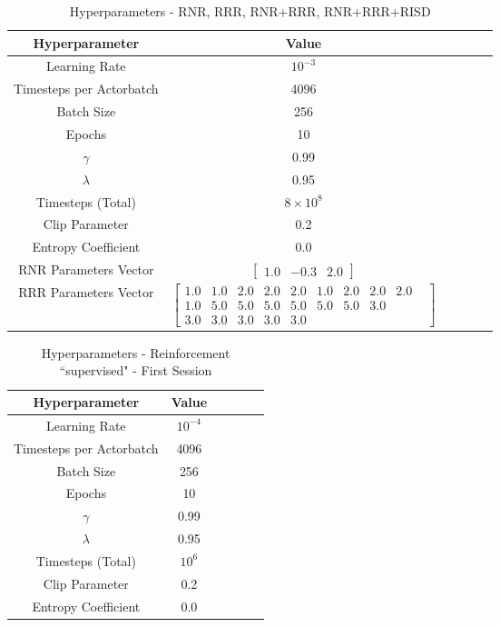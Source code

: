 
\begin{table}[!htbp]
	\caption{Hyperparameters - RNR, RRR, RNR+RRR, RNR+RRR+RISD}
	\begin{center} 
		\begin{tabular}{|c|c|c|c|c|c|}
			\hline
			Hyperparameter & Value   \\
			\hline
			Learning Rate &    $10^{-3}$    \\
			Timesteps per Actorbatch & 4096    \\
			Batch Size &   256     \\
			Epochs &  10\\
			$\gamma$ & 0.99 \\
			$\lambda$ & 0.95 \\
			Timesteps (Total) & $8 \times 10^{8}$ \\
			Clip Parameter & 0.2\\
			Entropy Coefficient & 0.0 \\
			RNR Parameters Vector  & $\begin{bmatrix}
				1.0 & -0.3 & 2.0
			\end{bmatrix}$\\
			RRR Parameters Vector  & $\begin{bmatrix}
			1.0 & 1.0 & 2.0 & 2.0 & 2.0 & 1.0 & 2.0 & 2.0 & 2.0 & \\ 1.0 & 5.0 & 5.0 & 5.0 & 5.0 & 5.0 & 5.0 & 3.0 &\\ 3.0 & 3.0 & 3.0 & 3.0 & 3.0 
			\end{bmatrix}$\\
			\hline
		\end{tabular}
	
		\label{tab:finaltest}
	\end{center}
\end{table}


\begin{table}[!htbp]
	\caption{Hyperparameters - Reinforcement ``supervised" - First Session}
	\begin{center} 
		\begin{tabular}{|c|c|c|c|c|c|}
			\hline
			Hyperparameter & Value   \\
			\hline
			Learning Rate &    $10^{-4}$    \\
			Timesteps per Actorbatch & 4096    \\
			Batch Size &   256     \\
			Epochs &  10\\
			$\gamma$ & 0.99 \\
			$\lambda$ & 0.95 \\
			Timesteps (Total) & $10^{6}$ \\
			Clip Parameter & 0.2\\
			Entropy Coefficient & 0.0 \\
			\hline
		\end{tabular}
		
		\label{tab:finaltest}
	\end{center}
\end{table}

